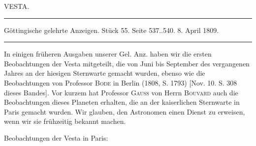 \begin{center}
VESTA.

\par\vspace{4pt}\hrule\vspace{4pt}

\fontsize{9}{11}\selectfont Göttingische gelehrte Anzeigen. Stück 55. Seite 537..540. 8. April 1809.

\par\vspace{4pt}\hrule\vspace{4pt}
\end{center}

In einigen früheren Ausgaben unserer Gel. Anz. haben wir die ersten Beobachtungen der Vesta mitgeteilt, die von Juni bis September des vergangenen Jahres an der hiesigen Sternwarte gemacht wurden, ebenso wie die Beobachtungen von Professor \textsc{Bode} in Berlin (1808, S. 1793) [Nov. 10. S. 308 dieses Bandes]. Vor kurzem hat Professor \textsc{Gauss} von Herrn \textsc{Bouvard} auch die Beobachtungen dieses Planeten erhalten, die an der kaiserlichen Sternwarte in Paris gemacht wurden. Wir glauben, den Astronomen einen Dienst zu erweisen, wenn wir sie frühzeitig bekannt machen.

\begin{center}
Beobachtungen der Vesta in Paris:
\end{center}


